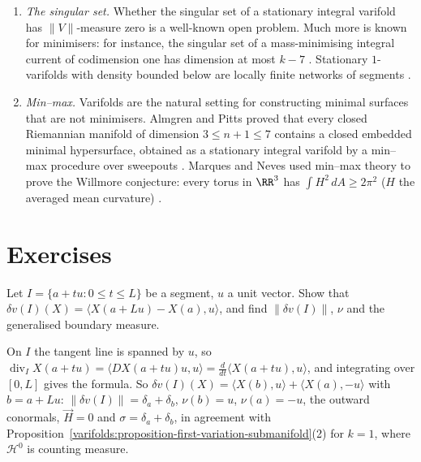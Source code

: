 \begin{remark}\label{varifolds:remark-survey}
\begin{enumerate}
\item \emph{The singular set.} Whether the singular set of a stationary integral varifold has $\|V\|$-measure zero is a well-known open problem. Much more is known for minimisers: for instance, the
singular set of a mass-minimising integral current of codimension one has dimension at most $k - 7$ \cite{simon-gmt}. Stationary $1$-varifolds with density bounded below are locally finite networks of
segments \cite{allard-almgren-1976}.
\item \emph{Min--max.} Varifolds are the natural setting for constructing minimal surfaces that are not minimisers. Almgren and Pitts proved that every closed Riemannian manifold of dimension $3 \leq n + 1 \leq 7$
contains a closed embedded minimal hypersurface, obtained as a stationary integral varifold by a min--max procedure over sweepouts \cite{pitts-1981}. Marques and Neves used min--max theory to prove the
Willmore conjecture: every torus in $\RR^3$ has $\int H^2\,dA \geq 2\pi^2$ ($H$ the averaged mean curvature) \cite{marques-neves-2014}.
\end{enumerate}
\end{remark}

\section{Exercises}\label{varifolds:section-exercises}

\begin{exercise}\label{varifolds:exercise-segment}
Let $I = \{a + tu : 0 \leq t \leq L\}$ be a segment, $u$ a unit vector. Show that $\delta v(I)(X) = \langle X(a + Lu) - X(a), u\rangle$, and find $\|\delta v(I)\|$, $\nu$ and the generalised boundary measure.
\end{exercise}

\begin{solution}
On $I$ the tangent line is spanned by $u$, so $\operatorname{div}_IX(a + tu) = \langle DX(a + tu)u, u\rangle = \frac{d}{dt}\langle X(a + tu), u\rangle$, and integrating over $[0, L]$ gives the formula. So
$\delta v(I)(X) = \langle X(b), u\rangle + \langle X(a), -u\rangle$ with $b = a + Lu$: $\|\delta v(I)\| = \delta_a + \delta_b$, $\nu(b) = u$, $\nu(a) = -u$, the outward conormals, $\vec{H} = 0$ and $\sigma = \delta_a + \delta_b$,
in agreement with Proposition~\ref{varifolds:proposition-first-variation-submanifold}(2) for $k = 1$, where $\mathcal{H}^0$ is counting measure.
\end{solution}

